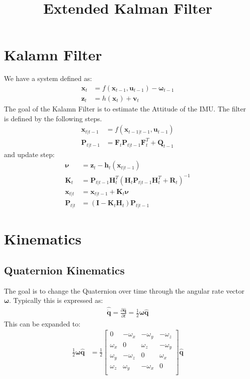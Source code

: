 \documentclass[10pt,a4paper]{article}
\newcommand{\M}[1]{\mathbf{#1}}
\newcommand{\V}[1]{\mathbf{#1}}
\newcommand{\Vh}[1]{\mathbf{\hat{#1}}}
\begin{document}
\title{Extended Kalman Filter}

\maketitle

\section{Kalamn Filter}
We have a system defined as:
\begin{align}
  \V x_ t&= f(\V x_{t-1}, \V u_{t-1}) - \V \omega_{t-1} \\
  \V z_ t&= h(\V x_t) + \V v_t
\end{align}
The goal of the Kalamn Filter is to estimate the Attitude of the IMU.
The filter is defined by the following steps.
\begin{align}
  \V x_{t|t-1} &= f(\V x_{t-1 | t-1}, \V u_{t-1}) \\ 
  \M P_{t|t-1} &= \M F_t \M P_{t|t-1} \M F_t^T + \M Q_{t-1}
\end{align}
and update step:
\begin{align}
  \boldsymbol \nu &=  \V z_t - \M h_t( \V x_{t|t-1} )\\
  \V K_t &= \M P_{t|t-1} \M H_t^T \left( \M H_t \M P_{t|t-1} \M H_t^T + \M R_t \right)^{-1} \\
  \V x_{t|t} &= \V x_{t|t-1} + \V K_t \boldsymbol \nu \\
  \M P_{t|t} &= \left( \M I - \V K_t \M H_t \right) \M P_{t|t-1}
\end{align}


\section{Kinematics}
\subsection {Quaternion Kinematics}
The goal is to change the Quaternion over time through the angular rate vector $\V \omega$.
Typically this is expressed as: 
\begin{align}
  \Vh{ \dot q} = \frac {\partial \Vh q} {\partial t} = \frac 1 2 \V \omega \Vh q
\end{align}
This can be expanded to: 
\begin{align}
  \frac 1 2 \V \omega \Vh q &= \frac 1 2 \begin{bmatrix}
                                0 & - \omega_x  & - \omega_y  & - \omega_z  \\ 
                                \omega_x  &  0 &  \omega_z  &  -\omega_y  \\ 
                                \omega_y  &  -\omega_z  &  0 & \omega_x  \\ 
                                 \omega_z  &  \omega_y  &  -\omega_x  &  0 \\ 
                              \end{bmatrix} \Vh q 
\end{align}
\end{document}
